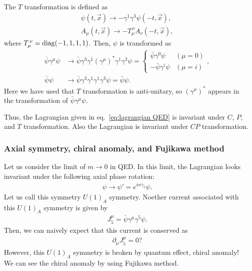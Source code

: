 \documentclass[11pt,a4paper]{article}
\begin{document}
The $T$ transformation is defined as
\begin{align}
    \psi(t,\vec x) \to -\gamma^1 \gamma^3 \psi(-t, \vec x), \\
    A_\mu(t,\vec x) \to -T_{\mu}^{\,\nu} A_\nu(-t, \vec x),
\end{align}
where $T_{\mu}^{\,\nu} = {\rm diag}(-1, 1, 1, 1)$.
Then, $\psi$ is transformed as
\begin{align}
    \bar\psi \gamma^\mu \psi &\to \bar\psi \gamma^3 \gamma^1 (\gamma^\mu)^* \gamma^1 \gamma^3 \psi = \begin{cases}
        \bar\psi \gamma^0 \psi & (\mu = 0) \\
        -\bar\psi \gamma^i \psi & (\mu = i)
    \end{cases}, \\
    \bar\psi \psi &\to \bar\psi \gamma^3 \gamma^1 \gamma^1 \gamma^3 \psi = \bar\psi \psi.
\end{align}
Here we have used that $T$ transformation is anti-unitary, so $(\gamma^\mu)^*$ appears in the transformation of $\bar\psi \gamma^\mu \psi$.

Thus, the Lagrangian given in eq.~\eqref{eq:lagrangian QED} is invariant under $C$, $P$, and $T$ transformation. Also the Lagrangian is invariant under $CP$ transformation.

\subsubsection{Axial symmetry, chiral anomaly, and Fujikawa method}
Let us consider the limit of $m\to 0$ in QED. In this limit, the Lagrangian looks invariant under the following axial phase rotation:
\begin{align}
    \psi \to \psi' = e^{i\alpha \gamma_5} \psi.
\end{align}
Let us call this symmetry $U(1)_A$ symmetry. Noether current associated with this $U(1)_A$ symmetry is given by
\begin{align}
    J_5^\mu = \bar\psi \gamma^\mu \gamma^5 \psi.
\end{align}
Then, we can naively expect that this current is conserved as
\begin{align}
    \partial_\mu J_5^\mu = 0?
\end{align}
However, this $U(1)_A$ symmetry is broken by quantum effect, chiral anomaly! We can see the chiral anomaly by using Fujikawa method.
\end{document}
